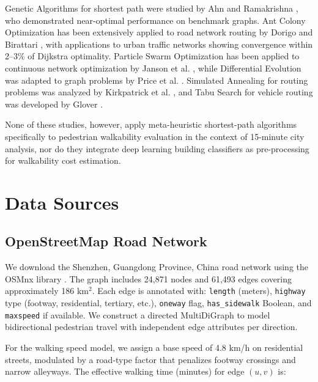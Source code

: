 \documentclass[journal]{IEEEtran}
\begin{document}
Genetic Algorithms for shortest path were studied by Ahn and Ramakrishna \cite{ahn2002genetic}, who demonstrated near-optimal performance on benchmark graphs. Ant Colony Optimization has been extensively applied to road network routing by Dorigo and Birattari \cite{dorigo2007ant}, with applications to urban traffic networks showing convergence within 2--3\% of Dijkstra optimality. Particle Swarm Optimization has been applied to continuous network optimization by Janson et al. \cite{janson2005hybrid}, while Differential Evolution was adapted to graph problems by Price et al. \cite{price2006differential}. Simulated Annealing for routing problems was analyzed by Kirkpatrick et al. \cite{kirkpatrick1983optimization}, and Tabu Search for vehicle routing was developed by Glover \cite{glover1989tabu}.

None of these studies, however, apply meta-heuristic shortest-path algorithms specifically to pedestrian walkability evaluation in the context of 15-minute city analysis, nor do they integrate deep learning building classifiers as pre-processing for walkability cost estimation.

\section{Data Sources}
\label{sec:data}

\subsection{OpenStreetMap Road Network}

We download the Shenzhen, Guangdong Province, China road network using the OSMnx library \cite{boeing2017osmnx}. The graph includes 24,871 nodes and 61,493 edges covering approximately 186 km$^2$. Each edge is annotated with: \texttt{length} (meters), \texttt{highway} type (footway, residential, tertiary, etc.), \texttt{oneway} flag, \texttt{has\_sidewalk} Boolean, and \texttt{maxspeed} if available. We construct a directed MultiDiGraph to model bidirectional pedestrian travel with independent edge attributes per direction.

For the walking speed model, we assign a base speed of 4.8 km/h on residential streets, modulated by a road-type factor that penalizes footway crossings and narrow alleyways. The effective walking time (minutes) for edge $(u,v)$ is:
\end{document}
